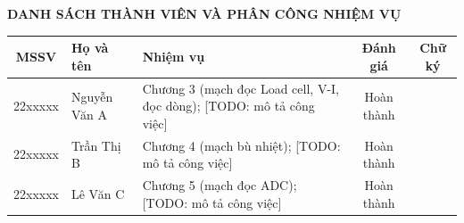 \begin{center}
    {\Large\bfseries DANH SÁCH THÀNH VIÊN VÀ PHÂN CÔNG NHIỆM VỤ}
\end{center}
\vspace{0.5em}

\begin{table}[H]
    \centering
    \renewcommand{\arraystretch}{1.4}
    \begin{tabularx}{\textwidth}{|c|l|X|c|c|}
        \hline
        \textbf{MSSV} & \textbf{Họ và tên} & \textbf{Nhiệm vụ} & \textbf{Đánh giá} & \textbf{Chữ ký} \\ \hline
        22xxxxx & Nguyễn Văn A & Chương 3 (mạch đọc Load cell, V-I, đọc dòng); [TODO: mô tả công việc] & Hoàn thành & \\ \hline
        22xxxxx & Trần Thị B   & Chương 4 (mạch bù nhiệt); [TODO: mô tả công việc] & Hoàn thành & \\ \hline
        22xxxxx & Lê Văn C     & Chương 5 (mạch đọc ADC); [TODO: mô tả công việc] & Hoàn thành & \\ \hline
    \end{tabularx}
\end{table}
